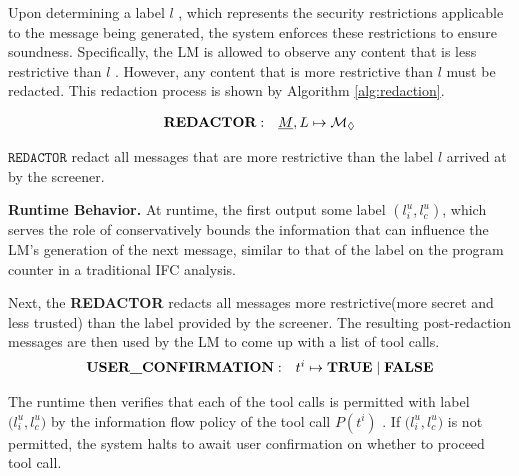 Upon determining a label $l$ , which represents the security restrictions applicable to the message being generated, the system enforces these restrictions to ensure soundness. Specifically, the LM is allowed to observe any content that is less restrictive than $l$ . However, any content that is more restrictive than $l$ must be redacted. This redaction process is shown by Algorithm \ref{alg:redaction}.

{
\setlength{\abovedisplayskip}{2pt}
\setlength{\belowdisplayskip}{2pt}
\begin{equation}
\begin{array}{l@{\;}rl}
\textbf{REDACTOR} & : & \underline{M} ,L \mapsto \mathcal{M}_{\redacted}
\end{array}
\end{equation}
}

$\texttt{REDACTOR}$ redact all messages that are more restrictive than the label $l$ arrived at by the screener. 

\noindent\textbf{Runtime Behavior.} At runtime, the \dependencydetector first output some label $(l_i^{u}, l_c^{u})$, which serves the role of conservatively bounds the information that can influence the LM’s generation of the next message, similar to that of the label on the program counter in a traditional IFC analysis.

Next, the \textbf{REDACTOR} redacts all messages more restrictive(more secret and less trusted) than the label provided by the screener. The resulting post-redaction messages are then used by the LM to come up with a list of tool calls.
{
\setlength{\abovedisplayskip}{2pt}
\setlength{\belowdisplayskip}{2pt}
\begin{equation*}
\begin{array}{l@{\;}rl}
\textbf{USER\_CONFIRMATION} & : & t^i\mapsto \textbf{TRUE} \mid \textbf{FALSE}
\end{array}
\end{equation*}
}

The runtime then verifies that each of the tool calls is permitted with label ${(l_i^{u}, l_c^{u}})$ by the information flow policy of the tool call $P(t^i)$ . If ${(l_i^{u}, l_c^{u}})$ is not permitted, the system halts to await user confirmation on whether to proceed tool call.

